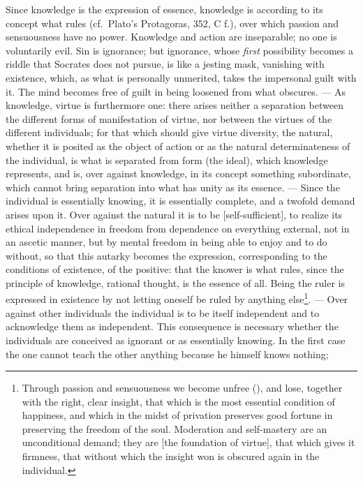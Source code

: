 Since knowledge is the expression of essence, knowledge is according to its concept
what rules (cf.\ Plato's Protagoras, 352, C f.), over which passion and sensuousness have no power. Knowledge and action are inseparable; no one is voluntarily evil. Sin is ignorance; but ignorance, whose \emph{first} possibility becomes a riddle
that Socrates does not pursue, is like a jesting mask, vanishing with existence, which, as what is personally unmerited,
takes the impersonal guilt with it. The mind becomes free of
guilt in being loosened from what obscures. --- As knowledge,
virtue is furthermore one: there arises neither a separation between the different forms of manifestation of virtue, nor between the virtues of the different individuals; for that which should give virtue
diversity, the natural, whether it is posited as the object of action or as the natural determinateness of the individual, is what is
separated from form (the ideal), which knowledge represents,
and is, over against knowledge, in its concept something subordinate, which
\setcounter{footnote}{0}cannot bring separation into what has unity as its essence.
--- Since the individual is essentially knowing, it is essentially complete, and a twofold demand arises upon it. Over against the natural it is to be  [self-sufficient], to realize its
ethical independence in freedom from dependence on everything external,
not in an ascetic manner, but by mental freedom in being able to
enjoy and to do without, so that this autarky becomes the expression, corresponding to the conditions of existence, of the positive: that the knower is what rules, since the principle of knowledge, rational
thought, is the essence of all. Being the ruler is expressed in existence by not letting oneself be ruled by anything else\footnote{Through passion and sensuousness we become unfree (),
and lose, together with the right, clear insight, that which is the most essential
condition of happiness, and which in the midst of privation preserves good fortune
in preserving the freedom of the soul. Moderation and self-mastery are
an unconditional demand; they are  [the foundation of virtue], that which gives it
firmness, that without which the insight won is obscured again in
the individual.}. --- Over against other individuals the individual is to be itself
independent and to acknowledge them as independent. This consequence is necessary whether the individuals are conceived as
ignorant or as essentially knowing. In the first case
the one cannot teach the other anything because he himself knows nothing;
